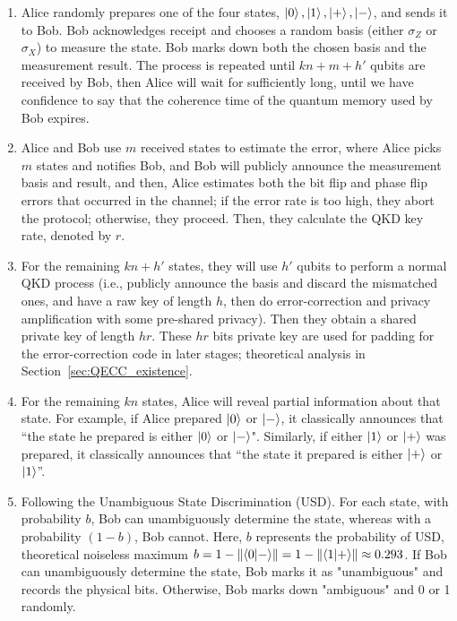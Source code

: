 \documentclass[%
 reprint,
superscriptaddress,
 amsmath,amssymb,
 aps,
]{revtex4-2}
\begin{document}
\begin{enumerate}

    \item Alice randomly prepares one of the four states, $\ket{0}, \ket{1}, \ket{+}, \ket{-}$, and sends it to Bob. Bob acknowledges receipt and chooses a random basis (either $\sigma_Z$ or $\sigma_X$) to measure the state. Bob marks down both the chosen basis and the measurement result. The process is repeated until $kn+m+h'$ qubits are received by Bob, then Alice will wait for sufficiently long, until we have confidence to say that the coherence time of the quantum memory used by Bob expires. 

    \item Alice and Bob use $m$ received states to estimate the error, where Alice picks $m$ states and notifies Bob, and Bob will publicly announce the measurement basis and result, and then, Alice estimates both the bit flip and phase flip errors that occurred in the channel; if the error rate is too high, they abort the protocol; otherwise, they proceed. Then, they calculate the QKD key rate, denoted by $r$.

    \item For the remaining $kn+h'$ states, they will use $h'$ qubits to perform a normal QKD process (i.e., publicly announce the basis and discard the mismatched ones, and have a raw key of length $h$, then do error-correction and privacy amplification with some pre-shared privacy). Then they obtain a shared private key of length $hr$. These $hr$ bits private key are used for padding for the error-correction code in later stages; theoretical analysis in Section~\ref{sec:QECC_existence}. 

    \item For the remaining $kn$ states, Alice will reveal partial information about that state. For example, if Alice prepared $\ket{0}$ or $\ket{-}$, it classically announces that ``the state he prepared is either $\ket{0}$ or $\ket{-}$". Similarly, if either $\ket{1}$ or $\ket{+}$ was prepared, it classically announces that ``the state it prepared is either $\ket{+}$ or $\ket{1}$''. 

    \item Following the Unambiguous State Discrimination (USD). For each state, with probability $b$, Bob can unambiguously determine the state, whereas with a probability $(1-b)$, Bob cannot. Here, $b$ represents the probability of USD, theoretical noiseless maximum $b = 1-\norm{\bra{0}\ket{-}} = 1-\norm{\bra{1}\ket{+}} \approx 0.293$. If Bob can unambiguously determine the state, Bob marks it as "unambiguous" and records the physical bits. Otherwise, Bob marks down "ambiguous" and 0 or 1 randomly.


\end{enumerate}
\end{document}
